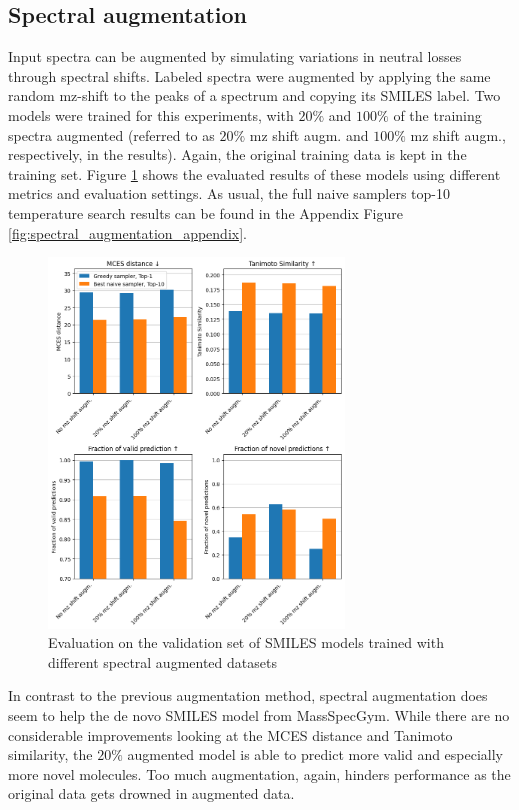 \subsection{Spectral augmentation}

Input spectra can be augmented by simulating variations in neutral losses through spectral shifts.
Labeled spectra were augmented by applying the same random mz-shift to the peaks of a spectrum and copying its SMILES label.
Two models were trained for this experiments, with $20\%$ and $100\%$ of the training spectra augmented (referred to as $20\%$ mz shift augm. and $100\%$ mz shift augm., respectively, in the results).
Again, the original training data is kept in the training set.
Figure \ref{fig:spectral_augm} shows the evaluated results of these models using different metrics and evaluation settings.
As usual, the full naive samplers top-10 temperature search results can be found in the Appendix Figure \ref{fig:spectral_augmentation_appendix}.

\begin{figure}[h]
    \centering
    \includegraphics[width=0.7\textwidth]{figures/results/spectrum_augmentation_with_tanimoto.png}
    \caption{Evaluation on the validation set of SMILES models trained with different spectral augmented datasets}
    \label{fig:spectral_augm}
\end{figure}

In contrast to the previous augmentation method, spectral augmentation does seem to help the de novo SMILES model from MassSpecGym.
While there are no considerable improvements looking at the MCES distance and Tanimoto similarity, the $20\%$ augmented model is able to predict more valid and especially more novel molecules.
Too much augmentation, again, hinders performance as the original data gets drowned in augmented data.

